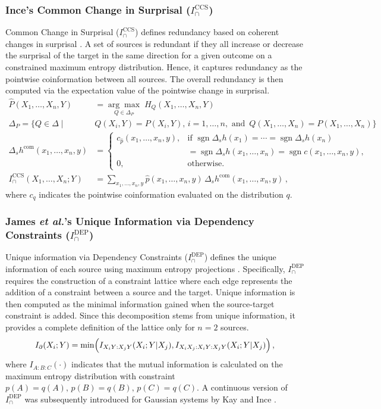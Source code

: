 \documentclass{article}
\makeatletter
\newcommand{\etalx}{\textit{et al.\@}\xspace}
\newcommand{\Xs}{X_1,\ldots,X_n}
\newcommand{\ICCS}{\ensuremath{I_\cap^{\text{CCS}}}\xspace}
\newcommand{\IDEP}{\ensuremath{I_\cap^{\text{DEP}}}\xspace}
\makeatother
\begin{document}
\subsubsection*{Ince's Common Change in Surprisal ($\ICCS$)}
Common Change in Surprisal ($\ICCS$) defines redundancy based on coherent changes in surprisal \cite{ince2017measuring}. A set of sources is redundant if they all increase or decrease the surprisal of the target in the same direction for a given outcome on a constrained maximum entropy distribution. Hence, it captures redundancy as the pointwise coinformation between all sources. The overall redundancy is then computed via the expectation value of the pointwise change in surprisal.
    \begin{align}
    \hat{P}(\Xs,Y)&=\underset{Q \in \Delta_P}{\arg\max}\;H_Q(\Xs,Y)
    \\[6pt]
    \Delta_P=\{Q \in \Delta \;|\; & Q(X_i,Y) = P(X_i,Y),\, i=1,\ldots,n, \text{ and }\,
    Q(\Xs) = P(\Xs)\} \\[6pt]
    \Delta_s h^{\mathrm{com}}(x_1,\ldots,x_n,y)
    &= \begin{cases} 
    c_{\hat{p}}(x_1,\ldots,x_n,y), & \text{if }  \operatorname{sgn}\Delta_s h(x_1) = \cdots = \operatorname{sgn}\Delta_s h(x_n) \\[2pt] &= \operatorname{sgn}\Delta_s h(x_1,\ldots,x_n) = \operatorname{sgn}c(x_1,\ldots,x_n,y), \\[6pt]
    0, & \text{otherwise}.
    \end{cases} \\[6pt]
    I_\cap^{\mathrm{CCS}}(\Xs;Y)
    &= \sum_{x_1,\ldots,x_n,y} \hat{p}(x_1,\ldots,x_n,y)\,
    \Delta_s h^{\mathrm{com}}(x_1,\ldots,x_n,y) \,,
    \end{align}
    where $c_q$ indicates the pointwise coinformation evaluated on the distribution $q$.

\subsubsection*{James \etalx's Unique Information via Dependency Constraints ($\IDEP$)}
Unique information via Dependency Constraints ($\IDEP$) defines the unique information of each source using maximum entropy projections \cite{james2018unique}. Specifically, $\IDEP$ requires the construction of a constraint lattice where each edge represents the addition of a constraint between a source and the target. Unique information is then computed as the minimal information gained when the source-target constraint is added. Since this decomposition stems from unique information, it provides a complete definition of the lattice only for $n=2$ sources.
\begin{equation}
    I_\partial(X_i;Y) = \min\Bigl(I_{X_iY:X_jY}(X_i;Y|X_j), I_{X_iX_j:X_iY:X_jY}(X_i;Y|X_j) \Bigr) \,,
\end{equation}
where $I_{A:B:C}(\cdot)$ indicates that the mutual information is calculated on the maximum entropy distribution with constraint $p(A)=q(A), \,p(B)=q(B), \,p(C)=q(C)$. A continuous version of $\IDEP$ was subsequently introduced for Gaussian systems by Kay and Ince \cite{kay2018exact}.
\end{document}
